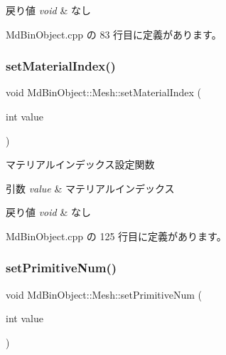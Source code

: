 \begin{DoxyRetVals}{戻り値}
{\em void} & なし \\
\hline
\end{DoxyRetVals}


 Md\+Bin\+Object.\+cpp の 83 行目に定義があります。

\mbox{\label{class_md_bin_object_1_1_mesh_ae847facdeb6ae73eab3e8e01ac8ea011}} 
\subsubsection{\texorpdfstring{set\+Material\+Index()}{setMaterialIndex()}}
{\footnotesize\ttfamily void Md\+Bin\+Object\+::\+Mesh\+::set\+Material\+Index (\begin{DoxyParamCaption}\item[{int}]{value }\end{DoxyParamCaption})}



マテリアルインデックス設定関数 


\begin{DoxyParams}{引数}
{\em value} & マテリアルインデックス \\
\hline
\end{DoxyParams}

\begin{DoxyRetVals}{戻り値}
{\em void} & なし \\
\hline
\end{DoxyRetVals}


 Md\+Bin\+Object.\+cpp の 125 行目に定義があります。

\mbox{\label{class_md_bin_object_1_1_mesh_a14d0fd4cc67bf8fb5c98772bd93d2eb1}} 
\subsubsection{\texorpdfstring{set\+Primitive\+Num()}{setPrimitiveNum()}}
{\footnotesize\ttfamily void Md\+Bin\+Object\+::\+Mesh\+::set\+Primitive\+Num (\begin{DoxyParamCaption}\item[{int}]{value }\end{DoxyParamCaption})}



